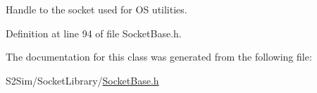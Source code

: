 Handle to the socket used for O\-S utilities. 



Definition at line 94 of file Socket\-Base.\-h.



The documentation for this class was generated from the following file\-:\begin{DoxyCompactItemize}
\item 
S2\-Sim/\-Socket\-Library/\hyperlink{_socket_base_8h}{Socket\-Base.\-h}\end{DoxyCompactItemize}
